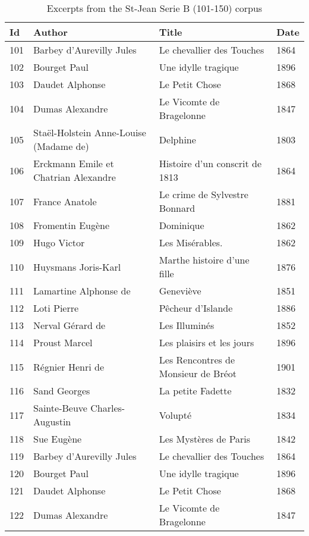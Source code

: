 \begin{table}[H]
  \centering
  \caption{Excerpts from the St-Jean Serie B (101-150) corpus}
  \label{tbl:st_jean_corpus_3}
  \begin{tabular}{l l l l}
    \toprule
    \textbf{Id} &
    \textbf{Author} &
    \textbf{Title} &
    \textbf{Date} \\
    \midrule
    101 & Barbey d'Aurevilly Jules & Le chevallier des Touches & 1864 \\
    102 & Bourget Paul & Une idylle tragique & 1896 \\
    103 & Daudet Alphonse & Le Petit Chose & 1868 \\
    104 & Dumas Alexandre & Le Vicomte de Bragelonne & 1847 \\
    105 & Staël-Holstein Anne-Louise (Madame de) & Delphine & 1803 \\
    106 & Erckmann Emile et Chatrian Alexandre & Histoire d’un conscrit de 1813 & 1864 \\
    107 & France Anatole & Le crime de Sylvestre Bonnard & 1881 \\
    108 & Fromentin Eugène & Dominique & 1862 \\
    109 & Hugo Victor & Les Misérables. & 1862 \\
    110 & Huysmans Joris-Karl & Marthe histoire d’une fille & 1876 \\
    111 & Lamartine Alphonse de & Geneviève & 1851 \\
    112 & Loti Pierre & Pêcheur d’Islande & 1886 \\
    113 & Nerval Gérard de & Les Illuminés & 1852 \\
    114 & Proust Marcel & Les plaisirs et les jours & 1896 \\
    115 & Régnier Henri de & Les Rencontres de Monsieur de Bréot & 1901 \\
    116 & Sand Georges & La petite Fadette & 1832 \\
    117 & Sainte-Beuve Charles-Augustin & Volupté & 1834 \\
    118 & Sue Eugène & Les Mystères de Paris & 1842 \\
    119 & Barbey d'Aurevilly Jules & Le chevallier des Touches & 1864 \\
    120 & Bourget Paul & Une idylle tragique & 1896 \\
    121 & Daudet Alphonse & Le Petit Chose & 1868 \\
    122 & Dumas Alexandre & Le Vicomte de Bragelonne & 1847 \\

\end{tabular}
\end{table}
